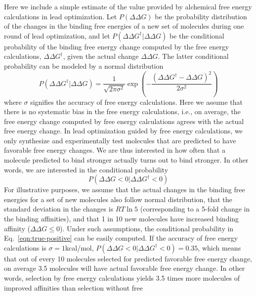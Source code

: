 \documentclass[9pt,bestpractices]{livecoms}
\begin{document}
Here we include a simple estimate of the value provided by alchemical
free energy calculations in lead optimization.  Let $P(\Delta\Delta
G)$ be the probability distribution of the changes in the binding free
energies of a new set of molecules during one round of lead
optimization, and let $P(\Delta\Delta G^\dagger|\Delta\Delta G)$ be the
conditional probability of the binding free energy change computed by
the free energy calculations, $\Delta\Delta G^\dagger$, given the actual
change $\Delta\Delta G$.  The latter conditional probability can be modeled
by a normal distribution
\begin{equation}
  P(\Delta\Delta G^\dagger|\Delta\Delta G) = \frac{1}{\sqrt{2\pi\sigma^2}}
  \exp\left(-\frac{(\Delta\Delta G^\dagger - \Delta\Delta G)^2}{2\sigma^2}\right)
  \label{eqn:free-energy-distribution}
\end{equation}
where $\sigma$ signifies the accuracy of free energy calculations.
Here we assume that there is no systematic bias in the free energy
calculations, i.e., on average, the free energy change computed by
free energy calculations agrees with the actual free energy change.
%
In lead optimization guided by free energy calculations, we only
synthesize and experimentally test molecules that are predicted to
have favorable free energy changes.  We are thus interested in how
often that a molecule predicted to bind stronger actually turns out to
bind stronger.  In other words, we are interested in the conditional
probability
\begin{equation}
  P(\Delta\Delta G<0|\Delta\Delta G^\dagger<0)
  \label{eqn:true-positive}
\end{equation}
%
For illustrative purposes, we assume that the actual changes in the
binding free energies for a set of new molecules also follow normal
distribution, that the standard deviation in the changes is $RT\ln 5$
(corresponding to a 5-fold change in the binding affinities), and that
1 in 10 new molecules have increased binding affinity ($\Delta\Delta G
\leq 0$).  Under such assumptions, the conditional probability in
Eq.~\ref{eqn:true-positive} can be easily computed.  If the accuracy
of free energy calculations is $\sigma = 1$kcal/mol, $P(\Delta\Delta
G<0|\Delta\Delta G^\dagger<0) = 0.35$, which means that out of every
10 molecules selected for predicted favorable free energy change, on
average 3.5 molecules will have actual favorable free energy change.
In other words, selection by free energy calculations yields 3.5 times
more molecules of improved affinities than selection without free
\end{document}
